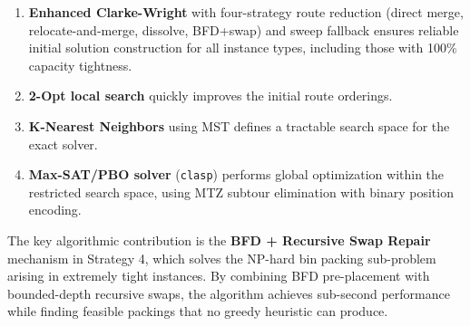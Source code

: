 \documentclass[12pt,a4paper]{article}
\theoremstyle{definition}
\begin{document}
\begin{enumerate}
    \item \textbf{Enhanced Clarke-Wright} with four-strategy route reduction (direct merge, relocate-and-merge, dissolve, BFD+swap) and sweep fallback ensures reliable initial solution construction for all instance types, including those with 100\% capacity tightness.
    
    \item \textbf{2-Opt local search} quickly improves the initial route orderings.
    
    \item \textbf{K-Nearest Neighbors} using MST defines a tractable search space for the exact solver.
    
    \item \textbf{Max-SAT/PBO solver} (\texttt{clasp}) performs global optimization within the restricted search space, using MTZ subtour elimination with binary position encoding.
\end{enumerate}

The key algorithmic contribution is the \textbf{BFD + Recursive Swap Repair} mechanism in Strategy 4, which solves the NP-hard bin packing sub-problem arising in extremely tight instances. By combining BFD pre-placement with bounded-depth recursive swaps, the algorithm achieves sub-second performance while finding feasible packings that no greedy heuristic can produce.
\end{document}
